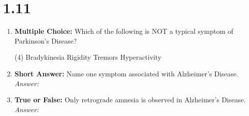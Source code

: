 \squigglyline
\section*{1.11}
\begin{enumerate}[label=\textbf{Q1.11.\arabic*}]
      \item \textbf{Multiple Choice:} Which of the following is NOT a typical symptom of Parkinson's Disease? 
      \begin{tasks}[label=(\Alph*), label-width=1.5em, item-indent=1.7em](4) 
            \task Bradykinesia
            \task Rigidity
            \task Tremors
            \task Hyperactivity
      \end{tasks}

      \item \textbf{Short Answer:} Name one symptom associated with Alzheimer's Disease. \\
            \textit{Answer:} %

      \item \textbf{True or False:} Only retrograde amnesia is observed in Alzheimer's Disease. \\
            \textit{Answer:} %
\end{enumerate}
